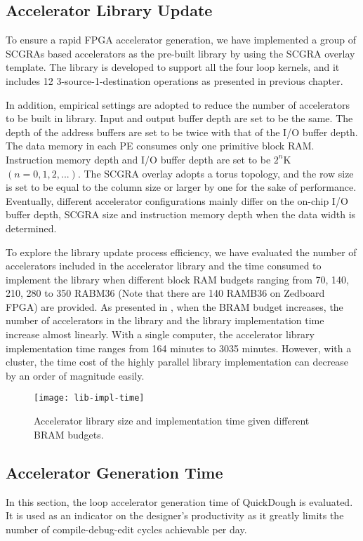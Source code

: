 \subsection{Accelerator Library Update} \label{subsec:lib-update}
To ensure a rapid FPGA accelerator generation, we have implemented a group of 
SCGRAs based accelerators as the pre-built library by using the SCGRA overlay template. 
The library is developed to support all the four loop kernels, and it includes 12 
3-source-1-destination operations as presented in previous chapter. 

In addition, empirical settings are adopted to reduce the number of accelerators to be built in
library. Input and output buffer depth are set to be the same. The depth of the address buffers are
set to be twice with that of the I/O buffer depth. The data memory in each PE consumes only one
primitive block RAM. Instruction memory depth and I/O buffer depth are set to be $2^n$K $(n=0,1,2,
...)$. The SCGRA overlay adopts a torus topology, and the row size is set to be equal
to the column size or larger by one for the sake of performance. Eventually, different accelerator
configurations mainly differ on the on-chip I/O buffer depth, SCGRA size and instruction memory depth
when the data width is determined. 

To explore the library update process efficiency, we have evaluated the number of accelerators included in
the accelerator library and the time consumed to implement the library when different block RAM
budgets ranging from 70, 140, 210, 280 to 350 RABM36 (Note that there are 140 RAMB36 on Zedboard FPGA) are
provided. As presented in , when the BRAM budget increases, the number of accelerators
in the library and the library implementation time increase almost linearly. With a single
computer, the accelerator library implementation time ranges from 164 minutes to 3035 minutes.
However, with a cluster, the time cost of the highly parallel library implementation can decrease by
an order of magnitude easily.

\begin{figure}
\centering
\texttt{[image: lib-impl-time]}
\caption{Accelerator library size and implementation time given different BRAM budgets.}
\label{fig:lib-impl-time}
\end{figure}

\subsection{Accelerator Generation Time} \label{subsec:acc-gen}
In this section, the loop accelerator generation time of QuickDough is evaluated. 
It is used as an indicator on the designer's productivity as it greatly limits 
the number of compile-debug-edit cycles achievable per day. 

